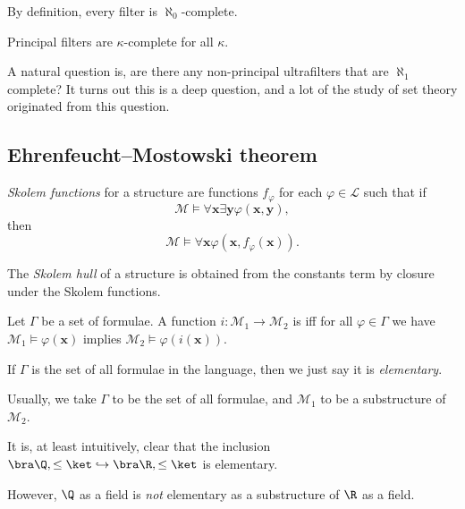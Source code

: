 \documentclass[a4paper]{article}
\begin{document}
\begin{eg}
  By definition, every filter is $\aleph_0$-complete.
\end{eg}

\begin{eg}
  Principal filters are $\kappa$-complete for all $\kappa$.
\end{eg}

A natural question is, are there any non-principal ultrafilters that are $\aleph_1$ complete? It turns out this is a deep question, and a lot of the study of set theory originated from this question.

\subsection{Ehrenfeucht--Mostowski theorem}
\begin{defi}
  \emph{Skolem functions} for a structure are functions $f_\varphi$ for each $\varphi \in \mathcal{L}$ such that if
  \[
    \mathcal{M} \vDash \forall \mathbf{x} \exists \mathbf{y} \varphi(\mathbf{x}, \mathbf{y}),
  \]
  then
  \[
    \mathcal{M} \vDash \forall \mathbf{x} \varphi(\mathbf{x}, f_\varphi(\mathbf{x})).
  \]
\end{defi}

\begin{defi}
  The \emph{Skolem hull} of a structure is obtained from the constants term by closure under the Skolem functions.
\end{defi}

\begin{defi}
  Let $\Gamma$ be a set of formulae. A function $i: \mathcal{M}_1 \to \mathcal{M}_2$ is  iff for all $\varphi \in \Gamma$ we have $\mathcal{M}_1 \vDash \varphi(\mathbf{x})$ implies $\mathcal{M}_2 \vDash \varphi(i(\mathbf{x}))$.

  If $\Gamma$ is the set of all formulae in the language, then we just say it is \emph{elementary}.
\end{defi} %
Usually, we take $\Gamma$ to be the set of all formulae, and $\mathcal{M}_1$ to be a substructure of $\mathcal{M}_2$.

\begin{eg}
  It is, at least intuitively, clear that the inclusion $\bra \Q, \leq\ket \hookrightarrow \bra \R, \leq \ket$ is elementary.

  However, $\Q$ as a field is \emph{not} elementary as a substructure of $\R$ as a field.
\end{eg}
\end{document}
